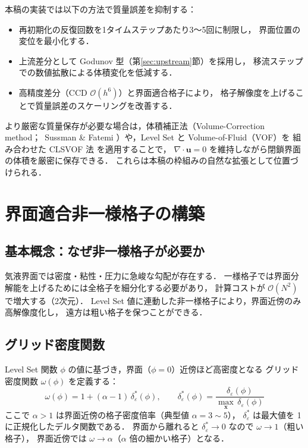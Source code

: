 \documentclass[12pt, a4paper, titlepage]{article}
\newcommand{\jp}[1]{{\normalfont\jpfont #1}}
\newcommand{\bu}{\bm{u}}
\newcommand{\de}{\delta_\varepsilon}
\newcommand{\Ord}[1]{\mathcal{O}(#1)}
\begin{document}
\jp{本稿の実装では以下の方法で質量誤差を抑制する：}
\begin{itemize}
  \item \jp{再初期化の反復回数を1タイムステップあたり3〜5回に制限し，
        界面位置の変位を最小化する．}
  \item \jp{上流差分として Godunov 型（第\ref{sec:upstream}節）を採用し，
        移流ステップでの数値拡散による体積変化を低減する．}
  \item \jp{高精度差分（CCD $\Ord{h^6}$）と界面適合格子により，
        格子解像度を上げることで質量誤差のスケーリングを改善する．}
\end{itemize}

\jp{より厳密な質量保存が必要な場合は，体積補正法（Volume-Correction method；\
Sussman \& Fatemi \cite{Sussman1999}）や，Level Set と Volume-of-Fluid（VOF）を
組み合わせた CLSVOF 法 \cite{Sussman2000} を適用することで，
$\nabla\cdot\bu=0$ を維持しながら閉鎖界面の体積を厳密に保存できる．
これらは本稿の枠組みの自然な拡張として位置づけられる．}

\section{\jp{界面適合非一様格子の構築}}
\label{sec:grid}

\subsection{\jp{基本概念：なぜ非一様格子が必要か}}

\jp{気液界面では密度・粘性・圧力に急峻な勾配が存在する．
一様格子では界面分解能を上げるためには全格子を細分化する必要があり，
計算コストが $\Ord{N^2}$ で増大する（2次元）．
Level Set 値に連動した非一様格子により，界面近傍のみ高解像度化し，
遠方は粗い格子を保つことができる．}

\subsection{\jp{グリッド密度関数}}

\jp{Level Set 関数 $\phi$ の値に基づき，界面（$\phi=0$）近傍ほど高密度となる
グリッド密度関数 $\omega(\phi)$ を定義する：}
\begin{equation}
  \omega(\phi) = 1 + (\alpha - 1)\,\de^*(\phi),
  \qquad
  \de^*(\phi) = \frac{\de(\phi)}{\displaystyle\max_{\bm{x}}\,\de(\phi)}
  \label{eq:density_func}
\end{equation}
\jp{ここで $\alpha > 1$ は界面近傍の格子密度倍率（典型値 $\alpha = 3\sim5$），
$\de^*$ は最大値を 1 に正規化したデルタ関数である．
界面から離れると $\de^*\to0$ なので $\omega\to1$（粗い格子），
界面近傍では $\omega\to\alpha$（$\alpha$ 倍の細かい格子）となる．}
\end{document}
